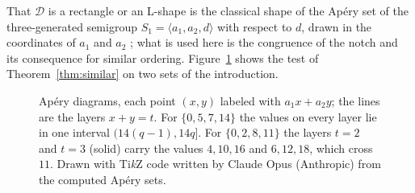That $\mathcal D$ is a rectangle or an L-shape is the classical shape of the Ap\'ery set of the three-generated semigroup $S_1=\langle a_1,a_2,d\rangle$ with respect to $d$, drawn in the coordinates of $a_1$ and $a_2$ \cite{AguiloMarijuan2014}; what is used here is the congruence of the notch and its consequence for similar ordering. Figure~\ref{fig:diagrams} shows the test of Theorem~\ref{thm:similar} on two sets of the introduction.

\begin{figure}[ht]
\centering
{}
\caption{Ap\'ery diagrams, each point $(x,y)$ labeled with $a_1x+a_2y$; the lines are the layers $x+y=t$. For $\{0,5,7,14\}$ the values on every layer lie in one interval $(14(q-1),14q]$. For $\{0,2,8,11\}$ the layers $t=2$ and $t=3$ (solid) carry the values $4,10,16$ and $6,12,18$, which cross $11$. Drawn with Ti\emph{k}Z code written by Claude Opus (Anthropic) from the computed Ap\'ery sets.}\label{fig:diagrams}
\end{figure}


